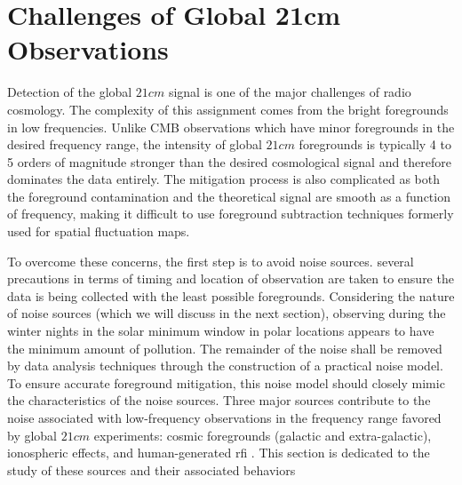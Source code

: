 \documentclass[12pt, TexShade, letterpaper]{report}
\begin{document}
\section{Challenges of Global 21cm Observations}
Detection of the global $21cm$ signal is one of the major challenges of radio cosmology. The complexity of this assignment comes from the bright foregrounds in low frequencies. Unlike CMB observations which have minor foregrounds in the desired frequency range, the intensity of global $21cm$ foregrounds is typically 4 to 5 orders of magnitude stronger than the desired cosmological signal and therefore dominates the data entirely. The mitigation process is also complicated as both the foreground contamination and the theoretical signal are smooth as a function of frequency, making it difficult to use foreground subtraction techniques formerly used for spatial fluctuation maps\cite{liu2013global, thesis_moso, thesis_shedding}.\par
To overcome these concerns, the first step is to avoid noise sources. several precautions in terms of timing and location of observation are taken to ensure the data is being collected with the least possible foregrounds. Considering the nature of noise sources (which we will discuss in the next section), observing during the winter nights in the solar minimum window in polar locations appears to have the minimum amount of pollution. The remainder of the noise shall be removed by data analysis techniques through the construction of a practical noise model. To ensure accurate foreground mitigation, this noise model should closely mimic the characteristics of the noise sources. Three major sources contribute to the noise associated with low-frequency observations in the frequency range favored by global $21cm$ experiments: cosmic foregrounds (galactic and extra-galactic), ionospheric effects, and human-generated \gls{rfi} \cite{thesis_pamela, thesis_shedding, book_21cm}. This section is dedicated to the study of these sources and their associated behaviors\par
\end{document}

